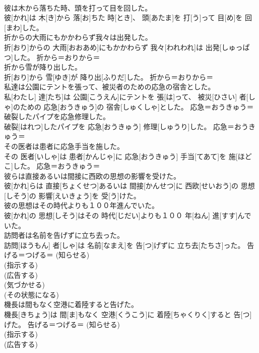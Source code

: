 \documentclass[8pt]{extreport}
\begin{document}
\begin{CJK}{UTF8}{min}
{\\	彼は木から落ちた時、頭を打って目を回した。	
\\	彼[かれ]は 木[き]から 落[お]ちた 時[とき]、 頭[あたま]を 打[う]って 目[め]を 回[まわ]した。	
\\	折からの大雨にもかかわらず我々は出発した。	
\\	折[おり]からの 大雨[おおあめ]にもかかわらず 我々[われわれ]は 出発[しゅっぱつ]した。	折から＝おりから＝ 
\\	折から雪が降り出した。	
\\	折[おり]から 雪[ゆき]が 降り出[ふりだ]した。	折から＝おりから＝ 
\\	私達は公園にテントを張って、被災者のための応急の宿舎とした。	
\\	私[わたし] 達[たち]は 公園[こうえん]にテントを 張[は]って、 被災[ひさい] 者[しゃ]のための 応急[おうきゅう]の 宿舎[しゅくしゃ]とした。	応急＝おうきゅう＝ 
\\	破裂したパイプを応急修理した。	
\\	破裂[はれつ]したパイプを 応急[おうきゅう] 修理[しゅうり]した。	応急＝おうきゅう＝ 
\\	その医者は患者に応急手当を施した。	
\\	その 医者[いしゃ]は 患者[かんじゃ]に 応急[おうきゅう] 手当[てあて]を 施[ほどこ]した。	応急＝おうきゅう＝ 
\\	彼らは直接あるいは間接に西欧の思想の影響を受けた。	
\\	彼[かれ]らは 直接[ちょくせつ]あるいは 間接[かんせつ]に 西欧[せいおう]の 思想[しそう]の 影響[えいきょう]を 受[う]けた。	
\\	彼の思想はその時代よりも１００年進んでいた。	
\\	彼[かれ]の 思想[しそう]はその 時代[じだい]よりも１００ 年[ねん] 進[すす]んでいた。	
\\	訪問者は名前を告げずに立ち去った。	
\\	訪問[ほうもん] 者[しゃ]は 名前[なまえ]を 告[つ]げずに 立ち去[たちさ]った。	告げる＝つげる＝ (知らせる) 
\\	(指示する) 
\\	(広告する) 
\\	(気づかせる) 
\\	(その状態になる)
\\	機長は間もなく空港に着陸すると告げた。	
\\	機長[きちょう]は 間[ま]もなく 空港[くうこう]に 着陸[ちゃくりく]すると 告[つ]げた。	告げる＝つげる＝ (知らせる) 
\\	(指示する) 
\\	(広告する) 
}
\end{CJK}
\end{document}
